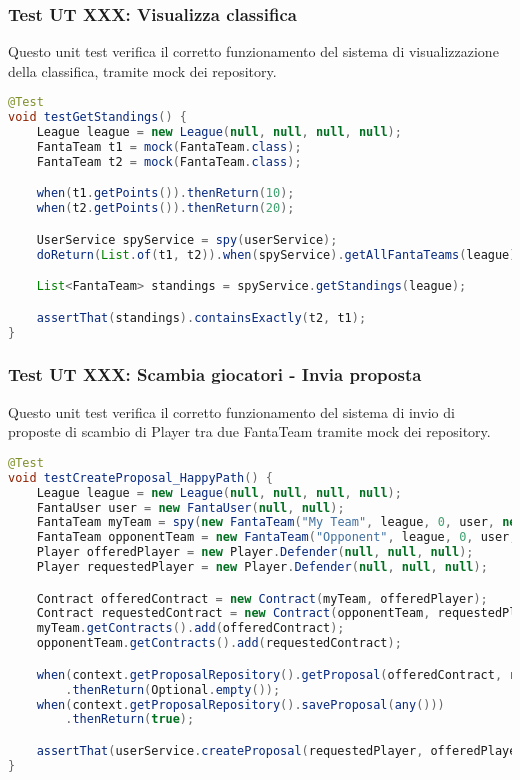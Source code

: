 \subsubsection{Test UT XXX: Visualizza classifica}

Questo unit test verifica il corretto funzionamento del sistema di visualizzazione della classifica,
tramite mock dei repository.

\begin{lstlisting}[language=Java]
@Test
void testGetStandings() {
	League league = new League(null, null, null, null);
	FantaTeam t1 = mock(FantaTeam.class);
	FantaTeam t2 = mock(FantaTeam.class);

	when(t1.getPoints()).thenReturn(10);
	when(t2.getPoints()).thenReturn(20);

	UserService spyService = spy(userService);
	doReturn(List.of(t1, t2)).when(spyService).getAllFantaTeams(league);

	List<FantaTeam> standings = spyService.getStandings(league);

	assertThat(standings).containsExactly(t2, t1);
}
\end{lstlisting}


\subsubsection{Test UT XXX: Scambia giocatori - Invia proposta}

Questo unit test verifica il corretto funzionamento del sistema di invio di proposte di scambio di Player tra due FantaTeam
tramite mock dei repository.

\begin{lstlisting}[language=Java]
@Test
void testCreateProposal_HappyPath() {
	League league = new League(null, null, null, null);
	FantaUser user = new FantaUser(null, null);
	FantaTeam myTeam = spy(new FantaTeam("My Team", league, 0, user, new HashSet<>()));
	FantaTeam opponentTeam = new FantaTeam("Opponent", league, 0, user, new HashSet<>());
	Player offeredPlayer = new Player.Defender(null, null, null);
	Player requestedPlayer = new Player.Defender(null, null, null);

	Contract offeredContract = new Contract(myTeam, offeredPlayer);
	Contract requestedContract = new Contract(opponentTeam, requestedPlayer);
	myTeam.getContracts().add(offeredContract);
	opponentTeam.getContracts().add(requestedContract);

	when(context.getProposalRepository().getProposal(offeredContract, requestedContract))
		.thenReturn(Optional.empty());
	when(context.getProposalRepository().saveProposal(any()))
        .thenReturn(true);

	assertThat(userService.createProposal(requestedPlayer, offeredPlayer, myTeam, opponentTeam)).isTrue();
}
\end{lstlisting}


